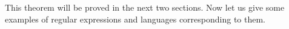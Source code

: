 

\setcounter{section}{2}
\setcounter{subsection}{1}
\setcounter{dfn}{3}


This theorem will be proved in the next two sections.
Now let us give some examples of regular expressions and languages corresponding to them.


